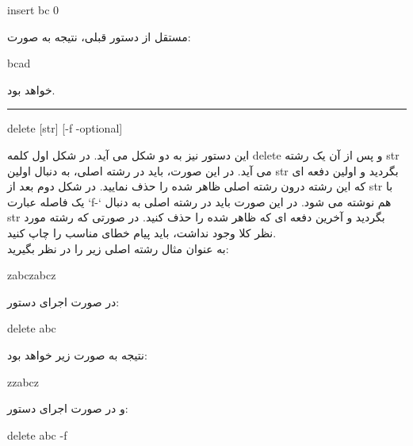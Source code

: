 \documentclass[]{article}
\begin{document}
\begin{tcolorbox}[boxrule=0pt]
	\begin{latin}
  	  \large{
  	  	insert bc 0
		}
	\end{latin}
\end{tcolorbox}
مستقل از دستور قبلی، نتیجه به صورت:
\begin{tcolorbox}[boxrule=0pt]
	\begin{latin}
  	  \large{
  	  	bcad
		}
	\end{latin}
\end{tcolorbox}
خواهد بود.\\
\noindent\rule[0.5ex]{\linewidth}{1pt}
\begin{tcolorbox}[boxrule=0pt]
	\begin{latin}
  	  \large{
  	  	delete [str] [-f -optional]
		}
	\end{latin}
\end{tcolorbox}
این دستور نیز به دو شکل می آید. در شکل اول کلمه delete و پس از آن یک رشته str می آید. در این صورت، باید در رشته اصلی، به دنبال اولین str بگردید و اولین دفعه ای که این رشته درون رشته اصلی ظاهر شده را حذف نمایید. در شکل دوم بعد از str با یک فاصله عبارت `f-` هم نوشته می شود. در این صورت باید در رشته اصلی به دنبال str بگردید و آخرین دفعه ای که ظاهر شده را حذف کنید. در صورتی که رشته مورد نظر کلا وجود نداشت، باید پیام خطای مناسب را چاپ کنید.\\
به عنوان مثال رشته اصلی زیر را در نظر بگیرید:\\
\begin{tcolorbox}[boxrule=0pt]
	\begin{latin}
  	  \large{
		zabczabcz
		}
	\end{latin}
\end{tcolorbox}
در صورت اجرای دستور:
\begin{tcolorbox}[boxrule=0pt]
	\begin{latin}
  	  \large{
  	  	delete abc
		}
	\end{latin}
\end{tcolorbox}
نتیجه به صورت زیر خواهد بود:
\begin{tcolorbox}[boxrule=0pt]
	\begin{latin}
  	  \large{
  	  	zzabcz
		}
	\end{latin}
\end{tcolorbox}
و در صورت اجرای دستور:
\begin{tcolorbox}[boxrule=0pt]
	\begin{latin}
  	  \large{
  	  	delete abc -f
		}
	\end{latin}
\end{tcolorbox}
\end{document}
